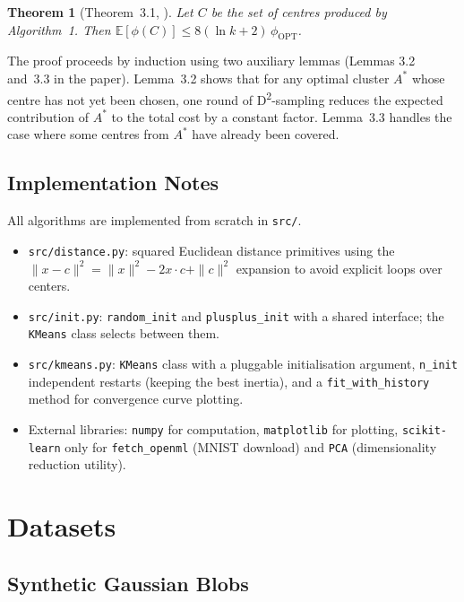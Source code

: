 \documentclass[11pt,a4paper]{article}
\newtheorem{theorem}{Theorem}
\newcommand{\OPT}{\phi_{\mathrm{OPT}}}
\newcommand{\phiC}{\phi(C)}
\newcommand{\E}{\mathbb{E}}
\begin{document}
\begin{theorem}[Theorem~3.1, \cite{arthur2007kmeans}]
  Let $C$ be the set of centres produced by Algorithm~1.
  Then $\E[\phiC] \leq 8(\ln k + 2)\,\OPT$.
\end{theorem}

The proof proceeds by induction using two auxiliary lemmas (Lemmas 3.2
and~3.3 in the paper).
Lemma~3.2 shows that for any optimal cluster $A^*$ whose centre has not
yet been chosen, one round of D\textsuperscript{2}-sampling reduces the
expected contribution of $A^*$ to the total cost by a constant factor.
Lemma~3.3 handles the case where some centres from $A^*$ have already been
covered.

\subsection{Implementation Notes}

All algorithms are implemented from scratch in \texttt{src/}.
\begin{itemize}
  \item \texttt{src/distance.py}: squared Euclidean distance primitives using
    the $\|x - c\|^2 = \|x\|^2 - 2x \cdot c + \|c\|^2$ expansion to avoid
    explicit loops over centers.
  \item \texttt{src/init.py}: \texttt{random\_init} and \texttt{plusplus\_init}
    with a shared interface; the \texttt{KMeans} class selects between them.
  \item \texttt{src/kmeans.py}: \texttt{KMeans} class with a pluggable
    initialisation argument, \texttt{n\_init} independent restarts (keeping
    the best inertia), and a \texttt{fit\_with\_history} method for
    convergence curve plotting.
  \item External libraries: \texttt{numpy} for computation,
    \texttt{matplotlib} for plotting, \texttt{scikit-learn} only for
    \texttt{fetch\_openml} (MNIST download) and \texttt{PCA}
    (dimensionality reduction utility).
\end{itemize}

\section{Datasets}

\subsection{Synthetic Gaussian Blobs}
\end{document}
